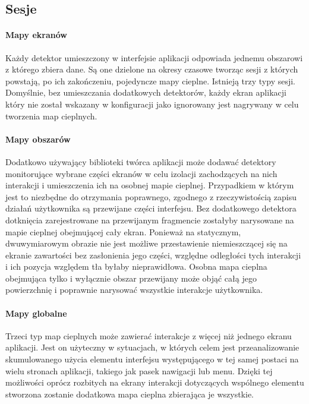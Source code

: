 \subsection{Sesje}

\paragraph{Mapy ekranów} Każdy detektor umieszczony w interfejsie aplikacji odpowiada jednemu obszarowi z którego zbiera dane. Są one dzielone na okresy czasowe tworząc sesji z których powstają, po ich zakończeniu, pojedyncze mapy cieplne. Istnieją trzy typy sesji. Domyślnie, bez umieszczania dodatkowych detektorów, każdy ekran aplikacji który nie został wskazany w konfiguracji jako ignorowany jest nagrywany w celu tworzenia map cieplnych.

\paragraph{Mapy obszarów} Dodatkowo używający biblioteki twórca aplikacji może dodawać detektory monitorujące wybrane części ekranów w celu izolacji zachodzących na nich interakcji i umieszczenia ich na osobnej mapie cieplnej. Przypadkiem w którym jest to niezbędne do otrzymania poprawnego, zgodnego z rzeczywistością zapisu działań użytkownika są przewijane części interfejsu. Bez dodatkowego detektora dotknięcia zarejestrowane na przewijanym fragmencie zostałyby narysowane na mapie cieplnej obejmującej cały ekran. Ponieważ na statycznym, dwuwymiarowym obrazie nie jest możliwe przestawienie niemieszczącej się na ekranie zawartości bez zasłonienia jego części, względne odległości tych interakcji i ich pozycja względem tła byłaby nieprawidłowa. Osobna mapa cieplna obejmująca tylko i wyłącznie obszar przewijany może objąć całą jego powierzchnię i poprawnie narysować wszystkie interakcje użytkownika.

\paragraph{Mapy globalne} Trzeci typ map cieplnych może zawierać interakcje z więcej niż jednego ekranu aplikacji. Jest on użyteczny w sytuacjach, w których celem jest przeanalizowanie skumulowanego użycia elementu interfejsu występującego w tej samej postaci na wielu stronach aplikacji, takiego jak pasek nawigacji lub menu. Dzięki tej możliwości oprócz rozbitych na ekrany interakcji dotyczących wspólnego elementu stworzona zostanie dodatkowa mapa cieplna zbierająca je wszystkie.

